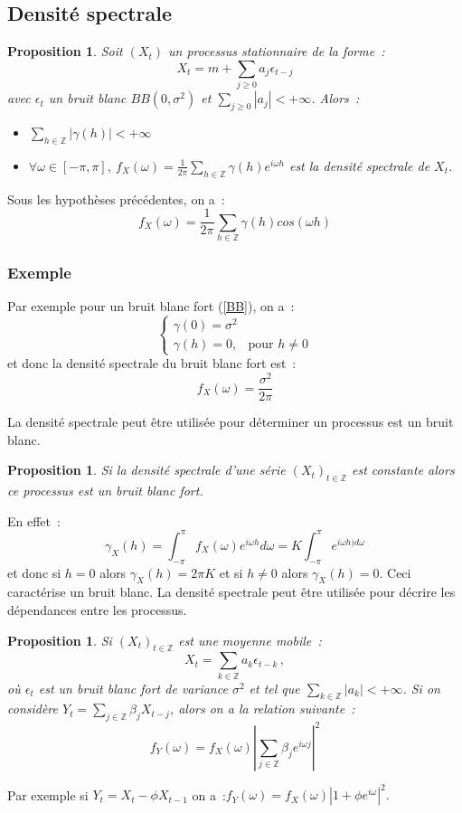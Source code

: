 \documentclass[11pt]{scrartcl} %
\newtheorem{pro}[theorem]{Proposition}
\newcommand{\Xt}{\left(X_t\right)_{t\in\mathbb{Z}}}
\begin{document}
\subsection{Densité spectrale}
\begin{pro}
Soit $(X_t)$ un processus stationnaire de la forme~:
$$
X_t = m+\sum_{j\geq 0}a_j\epsilon_{t-j}
$$
avec $\epsilon_t$ un bruit blanc $BB(0,\sigma^2)$ et $\sum_{j\geq 0}|a_j|<+\infty$. Alors~:
\begin{itemize}
\item $\sum_{h\in\mathbb{Z}}|\gamma(h)|<+\infty$\\
\item $\forall \omega\in[-\pi,\pi],~f_X(\omega)=\frac{1}{2\pi}\sum_{h\in\mathbb{Z}}\gamma(h)e^{i\omega h}$ est la densité spectrale de $X_t$.
\end{itemize}
\end{pro}
Sous les hypothèses précédentes, on a~:
$$
f_X(\omega)=\frac{1}{2\pi}\sum_{h\in\mathbb{Z}}\gamma(h)cos(\omega h)
$$
\subsubsection*{Exemple}
Par exemple pour un bruit blanc fort (\ref{BB}), on a~:
$$
\left\{
\begin{array}{cc}
\gamma(0)=\sigma^2&\\
\gamma(h)= 0,& \textrm{pour $h\not=0$} 
\end{array}
\right.
$$
et donc la densité spectrale du bruit blanc fort est~:
$$
f_X(\omega) = \frac{\sigma^2}{2\pi}
$$





La densité spectrale peut être utilisée pour déterminer un processus est un bruit blanc.
\begin{pro}
Si la densité spectrale d'une série $\Xt$ est constante alors ce processus est un bruit blanc fort.
\end{pro}
En effet~:
$$
\gamma_X(h)=\int_{-\pi}^{\pi}f_X(\omega)e^{i\omega h}d\omega = K\int_{-\pi}^{\pi}e^{i\omega h)d\omega}
$$
et donc si $h=0$ alors $\gamma_X(h)=2\pi K$ et si $h\not=0$ alors $\gamma_X(h)=0$. Ceci caractérise un bruit blanc. La densité spectrale peut être utilisée pour décrire les dépendances entre les processus.
\begin{pro}
Si $\Xt$ est une moyenne mobile~:
$$
X_t = \sum_{k\in\mathbb{Z}}a_k\epsilon_{t-k}\,,
$$
où $\epsilon_t$ est un bruit blanc fort de variance $\sigma^2$ et tel que $\sum_{k\in\mathbb{Z}}|a_k| <+\infty$. Si on considère $Y_t = \sum_{j\in\mathbb{Z}}\beta_jX_{t-j}$, alors on a la relation suivante~:
$$
f_Y(\omega)=f_X(\omega)\left|\sum_{j\in\mathbb{Z}}\beta_je^{i\omega j}\right|^2
$$
\end{pro}
Par exemple si $Y_t=X_t-\phi X_{t-1}$ on a~:$f_Y(\omega)=f_X(\omega)\left|1+\phi e^{i\omega}\right|^2.$
\end{document}
